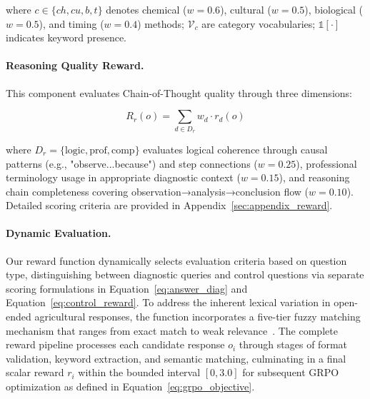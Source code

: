 \documentclass[11pt]{article}
\begin{document}
\noindent where $c \in \{ch, cu, b, t\}$ denotes chemical ($w=0.6$), cultural ($w=0.5$), biological ($w=0.5$), and timing ($w=0.4$) methods; $\mathcal{V}_c$ are category vocabularies; $\mathds{1}[\cdot]$ indicates keyword presence.

\paragraph{Reasoning Quality Reward.}
This component evaluates Chain-of-Thought quality through three dimensions:

\begin{equation}
R_r(o) = \sum_{d \in D_r} w_d \cdot r_d(o)
\label{eq:reasoning_reward}
\end{equation}

\noindent where $D_r = \{\text{logic}, \text{prof}, \text{comp}\}$ evaluates logical coherence through causal patterns (e.g., "observe...because") and step connections ($w=0.25$), professional terminology usage in appropriate diagnostic context ($w=0.15$), and reasoning chain completeness covering observation→analysis→conclusion flow ($w=0.10$). Detailed scoring criteria are provided in Appendix~\ref{sec:appendix_reward}.

\paragraph{Dynamic Evaluation.}
Our reward function dynamically selects evaluation criteria based on question type, distinguishing between diagnostic queries and control questions via separate scoring formulations in Equation~\ref{eq:answer_diag} and Equation~\ref{eq:control_reward}. To address the inherent lexical variation in open-ended agricultural responses, the function incorporates a five-tier fuzzy matching mechanism that ranges from exact match to weak relevance~\cite{reichard2025open}. The complete reward pipeline processes each candidate response $o_i$ through stages of format validation, keyword extraction, and semantic matching, culminating in a final scalar reward $r_i$ within the bounded interval $[0, 3.0]$ for subsequent GRPO optimization as defined in Equation~\ref{eq:grpo_objective}.

\end{document}
